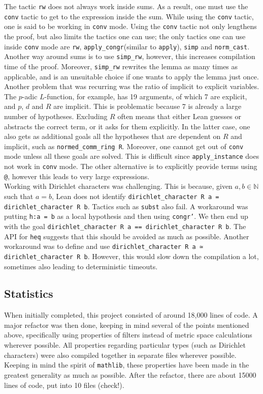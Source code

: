 \documentclass[11pt]{article}
\newcommand{\lean}[1]{\texttt{#1}\xspace} %
\begin{document}
The tactic \lean{rw} does not always work inside sums. As a result, one must use 
the \lean{conv} tactic to get to the expression inside the sum. While using the \lean{conv} tactic, one is said to be working 
in \lean{conv} mode. Using the \lean{conv} tactic not only lengthens the proof, but also limits the tactics one can use; the 
only tactics one can use inside \lean{conv} mode are \lean{rw}, \lean{apply\_congr}(similar to \lean{apply}), \lean{simp} and 
\lean{norm\_cast}. Another way around sums is to use \lean{simp\_rw}, however, this increases compilation time of the proof. 
Moreover, \lean{simp\_rw} rewrites the lemma as many times as applicable, and is an unsuitable choice if one wants to apply 
the lemma just once. \\

Another problem that was recurring was the ratio of implicit to explicit variables. The $p$-adic $L$-function, for example, has 19 arguments, of which 7 are explicit, and $p$, 
$d$ and $R$ are implicit. This is problematic because 7 is already a large number of hypotheses. Excluding $R$ often means that either Lean guesses or abstracts the correct term, 
or it asks for them explicitly. In the latter case, one also gets as additional goals all the hypotheses that are dependent on $R$ and implicit, such as \lean{normed\_comm\_ring R}. 
Moreover, one cannot get out of \lean{conv} mode unless all these goals are solved. This is difficult since \lean{apply\_instance} does not work in \lean{conv} mode. The other 
alternative is to explicitly provide terms using \lean{@}, however this leads to very large expressions. \\

Working with Dirichlet characters was challenging. This is because, given $a, b \in \mathbb{N}$ such that $a = b$, Lean does not identify 
\lean{dirichlet\_character R a = dirichlet\_character R b}. Tactics such as \lean{subst} also fail. A workaround was putting \lean{h:a = b} as a local hypothesis and then using 
\lean{congr'}. We then end up with the goal \lean{dirichlet\_character R a == dirichlet\_character R b}. The API for \lean{heq} suggests that this should be avoided as much as possible. 
Another workaround was to define and use \lean{dirichlet\_character R a ≃ dirichlet\_character R b}. However, this would slow down the compilation a lot, sometimes also leading to 
deterministic timeouts. 

\subsection*{Statistics}
When initially completed, this project consisted of around 18,000 lines of code. A major refactor was then done, keeping in mind several of the points mentioned above, specifically 
using properties of filters instead of metric space calculations wherever possible. All properties regarding particular types (such as Dirichlet characters) were also compiled together 
in separate files wherever possible. Keeping in mind the spirit of \lean{mathlib}, these properties have been made in the greatest generality as much as possible. 
After the refactor, there are about 15000 lines of code, put into 10 files (check!). \\
\end{document}
